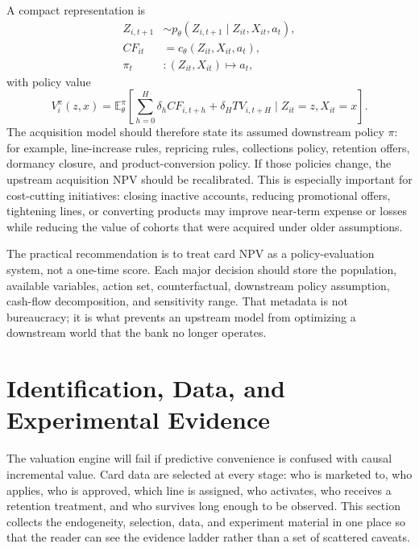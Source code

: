\documentclass[11pt]{article}
\newcommand{\E}{\mathbb{E}}
\newcommand{\1}{\mathbf{1}}
\begin{document}
A compact representation is
\begin{align}
  Z_{i,t+1} &\sim p_\theta(Z_{i,t+1}\mid Z_{it},X_{it},a_t),\\
  CF_{it}  &= c_\theta(Z_{it},X_{it},a_t),\\
  \pi_t    &: (Z_{it},X_{it}) \mapsto a_t,
  \label{eq:dynamic-policy-system}
\end{align}
with policy value
\begin{equation}
  V^\pi_i(z,x)
  =
  \E_\theta^\pi
  \left[
    \sum_{h=0}^{H}\delta_h CF_{i,t+h}
    + \delta_H TV_{i,t+H}
    \mid Z_{it}=z,X_{it}=x
  \right].
  \label{eq:policy-value}
\end{equation}
The acquisition model should therefore state its assumed downstream policy
$\pi$: for example, line-increase rules, repricing rules, collections policy,
retention offers, dormancy closure, and product-conversion policy. If those
policies change, the upstream acquisition NPV should be recalibrated. This is
especially important for cost-cutting initiatives: closing inactive accounts,
reducing promotional offers, tightening lines, or converting products may
improve near-term expense or losses while reducing the value of cohorts that
were acquired under older assumptions.

The practical recommendation is to treat card NPV as a policy-evaluation
system, not a one-time score. Each major decision should store the population,
available variables, action set, counterfactual, downstream policy assumption,
cash-flow decomposition, and sensitivity range. That metadata is not bureaucracy;
it is what prevents an upstream model from optimizing a downstream world that
the bank no longer operates.


\section{Identification, Data, and Experimental Evidence}
\label{sec:v4-identification-data}

The valuation engine will fail if predictive convenience is confused with
causal incremental value.  Card data are selected at every stage: who is
marketed to, who applies, who is approved, which line is assigned, who activates,
who receives a retention treatment, and who survives long enough to be observed.
This section collects the endogeneity, selection, data, and experiment material
in one place so that the reader can see the evidence ladder rather than a set of
scattered caveats.
\end{document}
